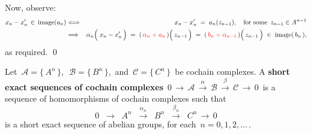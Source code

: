 \vskip 0.25cm
\noindent
Now, observe:
\begin{eqnarray*}
x_{n} - x_{n}^{\prime} \,\in\, \image(a_{n})
& \Longleftrightarrow &
	x_{n} - x_{n}^{\prime} \; = \; a_{n}(z_{n-1}),
	\quad
	\textnormal{for some \,$z_{n-1} \in A^{n-1}$}
\\
& \overset{{\color{white}1}}{\Longrightarrow} &
	\alpha_{n}\!\left(\;x_{n} \overset{{\color{white}.}}{-} x_{n}^{\prime}\,\right)
	\; = \;
		(\,{\color{red}\alpha_{n} \,\circ\, a_{n}}\,)\!\left(\,\overset{{\color{white}-}}{z_{n-1}}\,\right)
	\; = \;
		(\,{\color{red}b_{n} \,\circ\, \alpha_{n-1}}\,)\!\left(\,\overset{{\color{white}-}}{z_{n-1}}\,\right)
	\; \in \;
		\image(\,b_{n}\,),
\end{eqnarray*}
as required.
\qed


\begin{definition}
\mbox{}
\vskip 0.1cm
\noindent
Let
\,$\mathcal{A} = \{\,A^{n}\,\}$,\,
\,$\mathcal{B} = \{\,B^{n}\,\}$,\,
and
\,$\mathcal{C} = \{\,C^{n}\,\}$\,
be cochain complexes.
A \textbf{short exact sequences of cochain complexes}
\,$0 \,\longrightarrow\, \mathcal{A} \,\overset{\alpha}{\longrightarrow}\, \mathcal{B} \,\overset{\beta}{\longrightarrow}\, \mathcal{C} \,\longrightarrow\, 0$\,
is a sequence of homomorphisms of cochain complexes such that
\begin{equation*}
0
\;\; \longrightarrow \;\;
	A^{n}
\;\; \overset{\alpha_{n}}{\longrightarrow} \;\;
	B^{n}
\;\; \overset{\beta_{n}}{\longrightarrow} \;\;
	C^{n}
\,\longrightarrow\,
	0
\end{equation*}
is a short exact sequence of abelian groups, for each \,$n = 0, 1, 2, \ldots$\,.
\end{definition}


